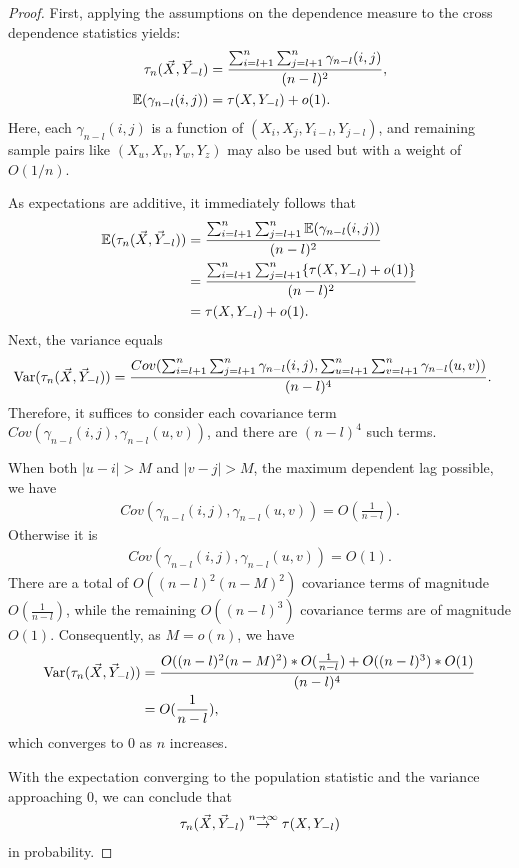 \begin{proof}
First, applying the assumptions on the dependence measure to the cross dependence statistics yields:
\begin{align*}
\tau_{n}(\vec{X}, \vec{Y}_{-l}) &=\frac{\sum_{i=l+1}^{n}\sum_{j=l+1}^{n} \gamma_{n-l}(i,j)}{(n-l)^2}, \\
\mathbb{E}(\gamma_{n-l}(i,j)) &= \tau(X, Y_{-l}) + o(1).
\end{align*}
Here, each $\gamma_{n-l}(i,j)$ is a function of $(X_i,X_j, Y_{i-l},Y_{j-l})$, and remaining sample pairs like $(X_u,X_v, Y_{w},Y_{z})$ may also be used but with a weight of $O(1/n)$.

As expectations are additive, it immediately follows that 
\begin{align*}
\mathbb{E}(\tau_{n}(\vec{X}, \vec{Y}_{-l})) &= \frac{\sum_{i=l+1}^{n}\sum_{j=l+1}^{n} \mathbb{E}(\gamma_{n-l}(i,j))}{(n-l)^2}\\
&= \frac{\sum_{i=l+1}^{n}\sum_{j=l+1}^{n} \{\tau(X, Y_{-l}) + o(1)\}}{(n-l)^2} \\
&= \tau(X, Y_{-l}) + o(1).
\end{align*}
Next, the variance equals
\begin{align*}
\text{Var}(\tau_{n}(\vec{X}, \vec{Y}_{-l})) &= \frac{Cov(\sum_{i=l+1}^{n}\sum_{j=l+1}^{n} \gamma_{n-l}(i,j), \sum_{u=l+1}^{n}\sum_{v=l+1}^{n} \gamma_{n-l}(u,v))}{(n-l)^4}.
\end{align*}
Therefore, it suffices to consider each covariance term $Cov(\gamma_{n-l}(i,j),\gamma_{n-l}(u,v))$, and there are $(n-l)^4$ such terms. 

When both $|u-i|>M$ and $|v-j|>M$, the maximum dependent lag possible, we have
\begin{align*}
Cov(\gamma_{n-l}(i,j),\gamma_{n-l}(u,v)) =  O(\frac{1}{n-l}).
\end{align*}
Otherwise it is
\begin{align*}
Cov(\gamma_{n-l}(i,j),\gamma_{n-l}(u,v))=  O(1).
\end{align*}
There are a total of $O((n-l)^2(n-M)^2)$ covariance terms of magnitude $O(\frac{1}{n-l})$, while the remaining $O((n-l)^3)$ covariance terms are of magnitude $O(1)$. Consequently, as $M=o(n)$, we have
\begin{align*}
\text{Var}(\tau_{n}(\vec{X}, \vec{Y}_{-l})) &= \frac{O((n-l)^2(n-M)^2) * O(\frac{1}{n-l}) + O((n-l)^3) * O(1)}{(n-l)^4}\\
&= O(\frac{1}{n-l}),
\end{align*}
which converges to $0$ as $n$ increases.

With the expectation converging to the population statistic and the variance approaching $0$, we can conclude that
\begin{align*}
     \tau_{n}(\vec{X}, \vec{Y}_{-l}) \stackrel{n \rightarrow \infty}{\rightarrow} \tau(X, Y_{-l})
     \end{align*}
     in probability.
\end{proof}

